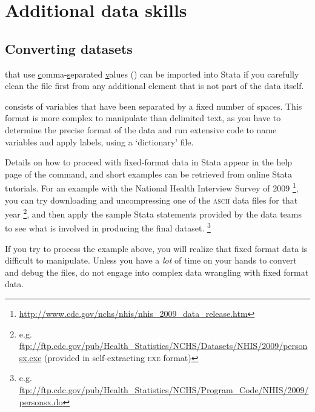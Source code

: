 %
%
\section{Additional data skills}
\label{sec:additional-data-skills}

%
\subsection{Converting datasets}
\label{sec:data-conversion}

\label{sec:insheet}

 that use \underline{c}omma-\underline{s}eparated \underline{v}alues () can be imported into Stata if you carefully clean the file first from any additional element that is not part of the data itself.%

\label{sec:infix}

 consists of variables that have been separated by a fixed number of spaces. This format is more complex to manipulate than delimited text, as you have to determine the precise format of the data and run extensive code to name variables and apply labels, using a `dictionary' file.%

Details on how to proceed with fixed-format data in Stata appear in the help page of the  command, and short examples can be retrieved from online Stata tutorials. For an example with the National Health Interview Survey of 2009%
  \footnote{\url{http://www.cdc.gov/nchs/nhis/nhis_2009_data_release.htm}}, %
  you can try downloading and uncompressing one of the \textsc{ascii} data files for that year%
  \footnote{e.g. \url{ftp://ftp.cdc.gov/pub/Health_Statistics/NCHS/Datasets/NHIS/2009/personsx.exe} (provided in self-extracting \textsc{exe} format)}, %
  and then apply the sample Stata statements provided by the data teams to see what is involved in producing the final dataset.%
  \footnote{e.g. \url{ftp://ftp.cdc.gov/pub/Health_Statistics/NCHS/Program_Code/NHIS/2009/personsx.do}}%

If you try to process the example above, you will realize that fixed format data is difficult to manipulate. Unless you have a \emph{lot} of time on your hands to convert and debug the files, do not engage into complex data wrangling with fixed format data.%

\label{sec:import-excel}

